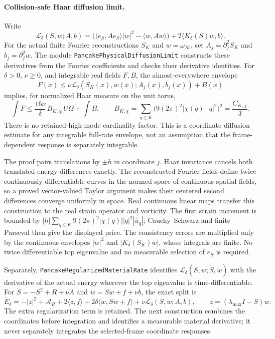 \documentclass[11pt]{article}
\theoremstyle{definition}
\begin{document}
\paragraph{Collision-safe Haar diffusion limit.}
Write
\[
 \mathcal L_\delta(S,w;A,b)
  =\bigl(\langle e_S,Ae_S\rangle|w|^2-\langle w,Aw\rangle\bigr)
       +2\langle K_\delta(S)w,b\rangle.
\]
For the actual finite Fourier reconstructions $S_K$ and
$w=\omega_{\mathcal M}$, set
$A_j=\partial_j^2 S_K$ and $b_j=\partial_j^2 w$.
The module \texttt{PancakePhysicalDiffusionLimit} constructs these
derivatives from the Fourier coefficients and checks their derivative
identities. For $\delta>0$, $\nu\ge0$, and integrable real fields $F,B$,
the almost-everywhere envelope
\[
 F(x)\le\nu\mathcal L_\delta(S_K(x),w(x);A_j(x),b_j(x))+B(x)
\]
implies, for normalized Haar measure on the unit torus,
\[
 \int F\le \frac{16\nu}{\delta}\,B_{K,\chi}\,U\Omega+\int B,
 \qquad
 B_{K,\chi}=\sum_{q\in K}
       \bigl(9(2\pi)^2|\chi(q)|\,|q|^2\bigr)^2
       =\frac{C_{K,\chi}}3.
\]
There is no retained-high-mode cardinality factor. This is a coordinate
diffusion estimate for any integrable full-rate envelope, not an
assumption that the frame-dependent response is separately integrable.

The proof pairs translations by $\pm h$ in coordinate $j$.
Haar invariance cancels both translated energy differences exactly.
The reconstructed Fourier fields define twice continuously differentiable
curves in the normed space of continuous spatial fields, so a proved
vector-valued Taylor argument makes their centered second differences
converge uniformly in space. Real continuous linear maps transfer this
construction to the real strain operator and vorticity.
The first strain increment is bounded by
$|h|\sum_{q\in K}9(2\pi)^2|\chi(q)||q|^2|\widehat u_q|$;
Cauchy--Schwarz and finite Parseval then give the displayed price.
The consistency errors are multiplied only by the continuous envelopes
$|w|^2$ and $|K_\delta(S_K)w|$, whose integrals are finite.
No twice differentiable top eigenvalue and no measurable selection of
$e_S$ is required.

Separately, \texttt{PancakeRegularizedMaterialRate} identifies
$\mathcal L_\delta(S,w;\dot S,\dot w)$ with the derivative of the
actual energy wherever the top eigenvalue is time-differentiable.
For $\dot S=-S^2+R+\nu A$ and $\dot w=Sw+f+\nu b$, the exact split is
\[
 \dot E_\delta=-|z|^2+\mathcal A_R+2\langle z,f\rangle
       +2\delta\langle w,Sw+f\rangle
       +\nu\mathcal L_\delta(S,w;A,b),
 \qquad z=(\lambda_{\max}I-S)w.
\]
The extra regularization term is retained. The next construction combines
the coordinates before integration and identifies a measurable material
derivative; it never separately integrates the selected-frame coordinate
responses.
\end{document}
